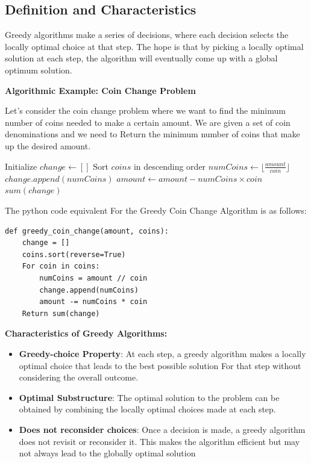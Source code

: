 \documentclass[12pt]{book} %
\begin{document}
\subsection{Definition and Characteristics}
Greedy algorithms make a series of decisions, where each decision selects the locally optimal choice at that step. The hope is that by picking a locally optimal solution at each step, the algorithm will eventually come up with a global optimum solution.

\textbf{Algorithmic Example: Coin Change Problem}

Let's consider the coin change problem where we want to find the minimum number of coins needed to make a certain amount. We are given a set of coin denominations and we need to Return the minimum number of coins that make up the desired amount.
\FloatBarrier
\begin{algorithm}
\caption{Greedy Coin Change Algorithm}
\begin{algorithmic}
    \State Initialize $change \gets []$
    \State Sort $coins$ in descending order
        \State $numCoins \gets \lfloor \frac{amount}{coin} \rfloor$
        \State $change.append(numCoins)$
        \State $amount \gets amount - numCoins \times coin$
    \EndFor
    \State \Return $sum(change)$
\EndFunction
\end{algorithmic}
\end{algorithm}
\FloatBarrier
The python code equivalent For the Greedy Coin Change Algorithm is as follows:
\FloatBarrier
\begin{lstlisting}
def greedy_coin_change(amount, coins):
    change = []
    coins.sort(reverse=True)
    For coin in coins:
        numCoins = amount // coin
        change.append(numCoins)
        amount -= numCoins * coin
    Return sum(change)
\end{lstlisting}
\FloatBarrier


\textbf{Characteristics of Greedy Algorithms:}
\begin{itemize}
    \item \textbf{Greedy-choice Property}: At each step, a greedy algorithm makes a locally optimal choice that leads to the best possible solution For that step without considering the overall outcome.
    \item \textbf{Optimal Substructure}: The optimal solution to the problem can be obtained by combining the locally optimal choices made at each step.
    \item \textbf{Does not reconsider choices}: Once a decision is made, a greedy algorithm does not revisit or reconsider it. This makes the algorithm efficient but may not always lead to the globally optimal solution
\end{itemize}
\end{document}
